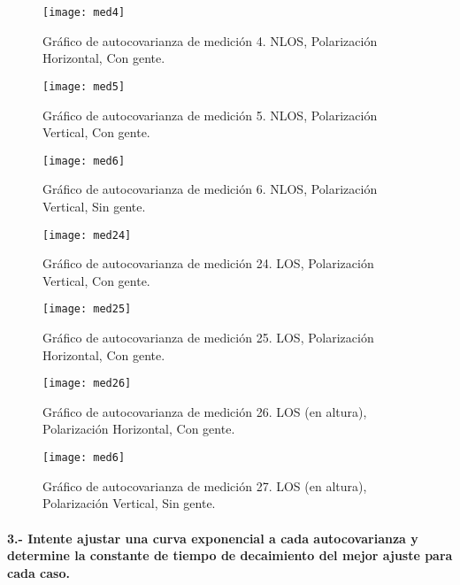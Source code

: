 \documentclass[12pt]{article}
\begin{document}
\begin{figure}[H]
  \centering
        \texttt{[image: med4]}
		\caption{\footnotesize
		Gráfico de autocovarianza de medición 4. NLOS, Polarización Horizontal, Con gente.}
\label{fig:med4}
\end{figure}

\begin{figure}[H]
  \centering
        \texttt{[image: med5]}
		\caption{\footnotesize
		Gráfico de autocovarianza de medición 5. NLOS, Polarización Vertical, Con gente.}
\label{fig:med5}
\end{figure}

\begin{figure}[H]
  \centering
        \texttt{[image: med6]}
		\caption{\footnotesize
		Gráfico de autocovarianza de medición 6. NLOS, Polarización Vertical, Sin gente.}
\label{fig:med6}
\end{figure}

\begin{figure}[H]
  \centering
        \texttt{[image: med24]}
		\caption{\footnotesize
		Gráfico de autocovarianza de medición 24. LOS, Polarización Vertical, Con gente.}
\label{fig:med24}
\end{figure}

\begin{figure}[H]
  \centering
        \texttt{[image: med25]}
		\caption{\footnotesize
		Gráfico de autocovarianza de medición 25. LOS, Polarización Horizontal, Con gente.}
\label{fig:med25}
\end{figure}

\begin{figure}[H]
  \centering
        \texttt{[image: med26]}
		\caption{\footnotesize
		Gráfico de autocovarianza de medición 26. LOS (en altura), Polarización Horizontal, 
		Con gente.}
\label{fig:med26}
\end{figure}

\begin{figure}[H]
  \centering
        \texttt{[image: med6]}
		\caption{\footnotesize
		Gráfico de autocovarianza de medición 27. LOS (en altura), Polarización Vertical, 
		Sin gente.}
\label{fig:med27}
\end{figure}

\normalsize

\paragraph{3.- Intente ajustar una curva exponencial a cada autocovarianza y determine la constante 
de tiempo de decaimiento del mejor ajuste para cada caso.\\}
\end{document}
